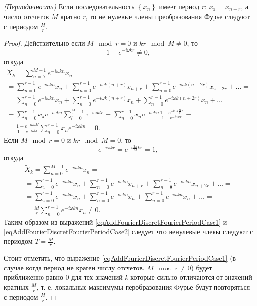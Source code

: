 \begin{lemma}
\emph{(Периодичность)}
\label{lemmaAddFourierDiscretFourierPeriod}
Если последовательность $\left\{x_n\right\}$ имеет период $r$: $x_n =
x_{n + r}$, а число отсчетов $M$ кратно $r$, то не нулевые члены
преобразования Фурье следуют с периодом $\frac{M}{r}$.
\end{lemma}

\begin{proof}
Действительно если $M \mod r = 0$ и $k r \mod M \ne 0$,
то
\[
1 - e^{-i \omega k r} \ne 0,
\]
откуда
\begin{eqnarray}
\tilde{X}_k = \sum_{n = 0}^{M - 1}e^{-i \omega k n}x_n = 
\nonumber \\
=
\sum_{n = 0}^{r - 1}e^{-i \omega k n} x_n + 
\sum_{n = 0}^{r - 1}e^{-i \omega k \left(n + r \right) } x_{n+r} + 
\sum_{n = 0}^{r - 1}e^{-i \omega k \left(n + 2r \right) } x_{n+2r} + 
\dots =
\nonumber \\
=
\sum_{n = 0}^{r - 1}e^{-i \omega k n} x_n + 
\sum_{n = 0}^{r - 1}e^{-i \omega k \left(n + r \right) } x_n + 
\sum_{n = 0}^{r - 1}e^{-i \omega k \left(n + 2r \right) } x_n + 
\dots =
\nonumber \\
= \sum_{n = 0}^{r - 1} x_n e^{-i \omega k n} 
\sum_{l = 0}^{\frac{M}{r}- 1} e^{-i \omega k l r } = 
\sum_{n = 0}^{r - 1} x_n e^{-i \omega k n} 
\frac{1 - e^{-i \omega k \frac{M}{r} r }}{1 - e^{-i \omega k r }} = 
\nonumber \\
=
\frac{1 - e^{-i \omega k M }}{1 - e^{-i \omega k r}}
\sum_{n = 0}^{r - 1} x_n e^{-i \omega k n} = 0.
\label{eqAddFourierDiscretFourierPeriodCase1}
\end{eqnarray}
Если $M \mod r = 0$ и $k r \mod M = 0$, то
\[
e^{-i \omega k r } = e^{-i \frac{2 \pi }{M} k r } = 1,
\]
откуда
\begin{eqnarray}
\tilde{X}_k = \sum_{n = 0}^{M - 1}e^{-i \omega k n}x_n = 
\nonumber \\
=
\sum_{n = 0}^{r - 1}e^{-i \omega k n} x_n + 
\sum_{n = 0}^{r - 1}e^{-i \omega k n } x_{n+r} + 
\sum_{n = 0}^{r - 1}e^{-i \omega k n } x_{n+2r} + 
\dots =
\nonumber \\
=
\sum_{n = 0}^{r - 1}e^{-i \omega k n} x_n + 
\sum_{n = 0}^{r - 1}e^{-i \omega k n  } x_n + 
\sum_{n = 0}^{r - 1}e^{-i \omega k n  } x_n + 
\dots = 
\nonumber \\ 
= \frac{M}{r} \sum_{n = 0}^{r - 1}e^{-i \omega k n  } x_n \ne 0.
\label{eqAddFourierDiscretFourierPeriodCase2}
\end{eqnarray}
Таким образом из выражений 
\eqref{eqAddFourierDiscretFourierPeriodCase1} и 
\eqref{eqAddFourierDiscretFourierPeriodCase2} следует что
ненулевые члены следуют с периодом $T = \frac{M}{r}$.

Стоит отметить, что выражение 
\eqref{eqAddFourierDiscretFourierPeriodCase1} (в случае когда
период не кратен числу отсчетов: $M \mod r \ne 0$) будет приближенно
равно 0 для тех значений $k$ которые сильно отличаются от значений
кратных $\frac{M}{r}$, т. е. локальные максимумы перобразования Фурье
будут повторяться с периодом $\frac{M}{r}$.
\end{proof}

